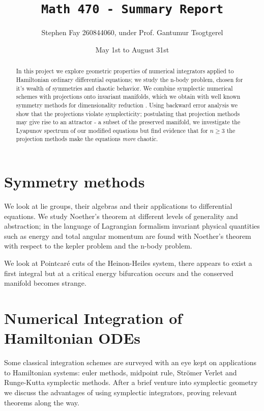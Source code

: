 \documentclass[12pt]{article}
\begin{document}
\title{\texttt{Math 470 - Summary Report}}
\author{Stephen Fay 260844060, under Prof. Gantumur Tsogtgerel}
\date{May 1st to August 31st}
\maketitle

\begin{abstract}
In this project we explore geometric properties of numerical integrators applied to Hamiltonian ordinary differential equations; we study the n-body problem, chosen for it's wealth of symmetries and chaotic behavior. We combine symplectic numerical schemes \cite{Numerical} with projections onto invariant manifolds, which we obtain with well known symmetry methods for dimensionality reduction \cite{Symmetry-methods}. Using backward error analysis we show that the projections violate symplecticity; postulating that projection methods may give rise to an attractor - a subset of the preserved manifold, we investigate the Lyapunov spectrum of our modified equations but find evidence that for $n\geq 3$ the projection methods make the equations \textit{more} chaotic. 
\end{abstract}

\section{Symmetry methods}
We look at lie groups, their algebras and their applications to differential equations. We study Noether's theorem at different levels of generality and abstraction; in the language of Lagrangian formalism invariant physical quantities such as energy and total angular momentum are found with Noether's theorem with respect to the kepler problem and the n-body problem. 

We look at Pointcar\'e cuts of the Heinon-Heiles system, there appears to exist a first integral but at a critical energy bifurcation occurs and the conserved manifold becomes strange. 

\section{Numerical Integration of Hamiltonian ODEs}
Some classical integration schemes are surveyed with an eye kept on applications to Hamiltonian systems: euler methods, midpoint rule, Str\"omer Verlet and Runge-Kutta symplectic methods. After a brief venture into symplectic geometry we discuss the advantages of using symplectic integrators, proving relevant theorems along the way. 
\end{document}
